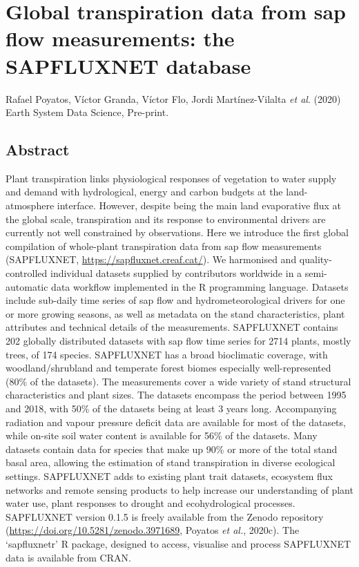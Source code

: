 \documentclass[11pt,twoside]{reedthesis}
\begin{document}
\newpage

\null\newpage

\chapter[The SAPFLUXNET database]{Global transpiration data from sap flow measurements: the SAPFLUXNET database}

\setlength{\parskip}{0.2cm plus4mm minus3mm} \setlength{\parindent}{0pt}
Rafael Poyatos, Víctor Granda, Víctor Flo, Jordi Martínez-Vilalta
\emph{et al}. (2020) Earth System Data Science, Pre-print. \newpage
\setlength{\parindent}{30pt}

\section*{Abstract}

Plant transpiration links physiological responses of vegetation to water
supply and demand with hydrological, energy and carbon budgets at the
land-atmosphere interface. However, despite being the main land
evaporative flux at the global scale, transpiration and its response to
environmental drivers are currently not well constrained by
observations. Here we introduce the first global compilation of
whole-plant transpiration data from sap flow measurements (SAPFLUXNET,
\url{https://sapfluxnet.creaf.cat/}). We harmonised and
quality-controlled individual datasets supplied by contributors
worldwide in a semi-automatic data workflow implemented in the R
programming language. Datasets include sub-daily time series of sap flow
and hydrometeorological drivers for one or more growing seasons, as well
as metadata on the stand characteristics, plant attributes and technical
details of the measurements. SAPFLUXNET contains 202 globally
distributed datasets with sap flow time series for 2714 plants, mostly
trees, of 174 species. SAPFLUXNET has a broad bioclimatic coverage, with
woodland/shrubland and temperate forest biomes especially
well-represented (80\% of the datasets). The measurements cover a wide
variety of stand structural characteristics and plant sizes. The
datasets encompass the period between 1995 and 2018, with 50\% of the
datasets being at least 3 years long. Accompanying radiation and vapour
pressure deficit data are available for most of the datasets, while
on-site soil water content is available for 56\% of the datasets. Many
datasets contain data for species that make up 90\% or more of the total
stand basal area, allowing the estimation of stand transpiration in
diverse ecological settings. SAPFLUXNET adds to existing plant trait
datasets, ecosystem flux networks and remote sensing products to help
increase our understanding of plant water use, plant responses to
drought and ecohydrological processes. SAPFLUXNET version 0.1.5 is
freely available from the Zenodo repository
(\url{https://doi.org/10.5281/zenodo.3971689}, Poyatos \emph{et al.},
2020c). The `sapfluxnetr' R package, designed to access, visualise and
process SAPFLUXNET data is available from CRAN.\par
\end{document}
